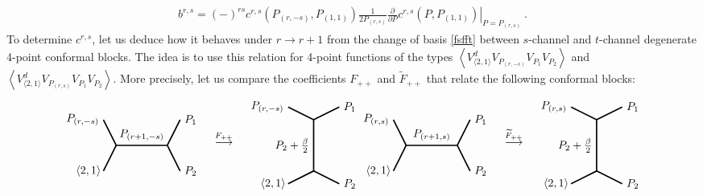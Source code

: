 \documentclass[12pt, a4paper]{article}
\begin{document}
\begin{align}
 b^{r,s} = (-)^{rs} c^{r,s}\left(P_{(r,-s)},P_{(1,1)}\right)  \frac{1}{2P_{(r,s)}}\left.\frac{\partial}{\partial P} c^{r,s}\left(P,P_{(1,1)}\right)\right|_{P=P_{(r,s)}}\ . 
 \label{bcdc}
\end{align}
To determine $c^{r,s}$, let us deduce how it behaves under $r\to r+1$ from the change of basis \eqref{fsfft} between $s$-channel and $t$-channel degenerate 4-point conformal blocks. The idea is to use this relation for 4-point functions of the types $\left<V^d_{\langle 2,1\rangle}V_{P_{(r,-s)}}V_{P_1}V_{P_2}\right>$ and $\left<V^d_{\langle 2,1\rangle}V_{P_{(r,s)}}V_{P_1}V_{P_2}\right>$. More precisely, let us compare the coefficients $F_{++}$ and $\widetilde{F}_{++}$ that relate the following conformal blocks:
\begin{subequations}
\begin{align}
  \begin{tikzpicture}[baseline=(current  bounding  box.center), very thick, scale = .4]
\draw (-1,2) node [left] {$P_{(r,-s)}$} -- (0,0) -- node [above] {$P_{(r+1,-s)}$} (4,0) -- (5,2) node [right] {$P_1$};
\draw (-1,-2) node [left] {$\langle 2,1\rangle\!$} -- (0,0);
\draw (4,0) -- (5,-2) node [right] {$P_2$};
\end{tikzpicture}
\quad \overset{F_{++}}{\longrightarrow} \quad 
\begin{tikzpicture}[baseline=(current  bounding  box.center), very thick, scale = .4]
 \draw (-2,3) node [left] {$P_{(r,-s)}$} -- (0,2) -- node [left] {$P_2+\frac{\beta}{2}$} (0,-2) -- (-2, -3) node [left] {$\langle 2,1\rangle\!$};
\draw (0,2) -- (2,3) node [right] {$P_1$};
\draw (0,-2) -- (2, -3) node [right] {$P_2$};
\end{tikzpicture}
\end{align}
\begin{align}
\begin{tikzpicture}[baseline=(current  bounding  box.center), very thick, scale = .4]
\draw (-1,2) node [left] {$P_{(r,s)}$} -- (0,0) -- node [above] {$P_{(r+1,s)}$} (4,0) -- (5,2) node [right] {$P_1$};
\draw (-1,-2) node [left] {$\langle 2,1\rangle\!$} -- (0,0);
\draw (4,0) -- (5,-2) node [right] {$P_2$};
\end{tikzpicture}
\quad \overset{\widetilde{F}_{++}}{\longrightarrow} \quad 
\begin{tikzpicture}[baseline=(current  bounding  box.center), very thick, scale = .4]
 \draw (-2,3) node [left] {$P_{(r,s)}$} -- (0,2) -- node [left] {$P_2+\frac{\beta}{2}$} (0,-2) -- (-2, -3) node [left] {$\langle 2,1\rangle\!$};
\draw (0,2) -- (2,3) node [right] {$P_1$};
\draw (0,-2) -- (2, -3) node [right] {$P_2$};
\end{tikzpicture}
\end{align}
\end{subequations}
\end{document}
